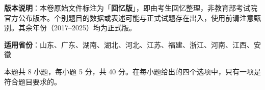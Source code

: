 

\begin{gknotice}
\textbf{ 版本说明}：本卷原始文件标注为「\textbf{回忆版}」，即由考生回忆整理，非教育部考试院官方公布版本。个别题目的数据或表述可能与正式试题存在出入，使用前请注意甄别。其余年份（2017–2025）均为正式版。

\textbf{适用省份}：山东、广东、湖南、湖北、河北、江苏、福建、浙江、河南、江西、安徽
\end{gknotice}

\par\medskip


\begin{gktip}
本题共 8 小题，每小题 5 分，共 40 分。在每小题给出的四个选项中，只有一项是符合题目要求的。
\end{gktip}

